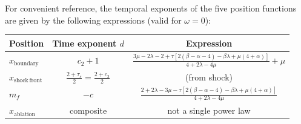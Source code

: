 \documentclass[11pt]{article}
\begin{document}
For convenient reference, the temporal exponents of the five position functions are given by the following expressions (valid for $\omega=0$):

\begin{center}
\begin{tabular}{lcc}
\hline
Position & Time exponent $d$ & Expression \\
\hline
$x_{\mathrm{boundary}}$ & $c_2+1$ & $\frac{3\mu - 2\lambda - 2 + \tau\left[2(\beta-\alpha-4)-\beta\lambda+\mu(4+\alpha)\right]}{4+2\lambda-4\mu}+\mu$ \\[6pt]
$x_{\mathrm{shock\,front}}$ & $\frac{2+\tau_s}{2} = \frac{2+c_3}{2}$ & (from shock) \\[6pt]
$m_f$ & $-c$ & $\frac{2+2\lambda-3\mu-\tau\left[2(\beta-\alpha-4)-\beta\lambda+\mu(4+\alpha)\right]}{4+2\lambda-4\mu}$ \\[6pt]
$x_{\mathrm{ablation}}$ & composite & not a single power law \\
\hline
\end{tabular}
\end{center}
\end{document}
